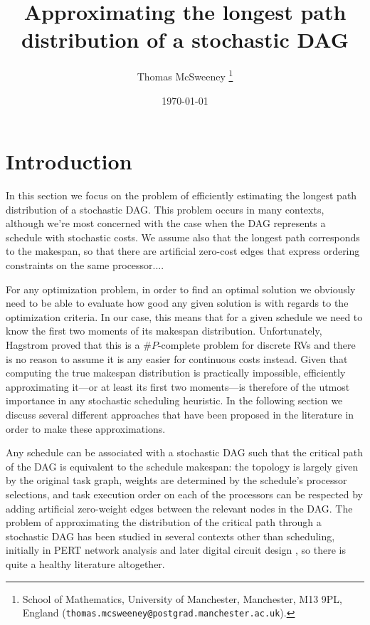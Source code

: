 \documentclass[12pt]{article}
\title{Approximating the longest path distribution of a stochastic DAG} %
\author{Thomas McSweeney%
	\thanks{%
		School of Mathematics,
		University of Manchester,
		Manchester, M13 9PL, England
		(\texttt{thomas.mcsweeney@postgrad.manchester.ac.uk}).
	}
}
\date{\today}
\begin{document}
	\maketitle 	


\section{Introduction}
\label{sect.intro}

In this section we focus on the problem of efficiently estimating the longest path distribution of a stochastic DAG. This problem occurs in many contexts, although we're most concerned with the case when the DAG represents a schedule with stochastic costs. We assume also that the longest path corresponds to the makespan, so that there are artificial zero-cost edges that express ordering constraints on the same processor....

For any optimization problem, in order to find an optimal solution we obviously need to be able to evaluate how good any given solution is with regards to the optimization criteria. In our case, this means that for a given schedule we need to know the first two moments of its makespan distribution. Unfortunately, Hagstrom \cite{hag88} proved that this is a $\#P$-complete problem for discrete RVs and there is no reason to assume it is any easier for continuous costs instead. Given that computing the true makespan distribution is practically impossible, efficiently approximating it---or at least its first two moments---is therefore of the utmost importance in any stochastic scheduling heuristic. In the following section we discuss several different approaches that have been proposed in the literature in order to make these approximations.

Any schedule can be associated with a stochastic DAG such that the critical path of the DAG is equivalent to the schedule makespan: the topology is largely given by the original task graph, weights are determined by the schedule's processor selections, and task execution order on each of the processors can be respected by adding artificial zero-weight edges between the relevant nodes in the DAG. The problem of approximating the distribution of the critical path through a stochastic DAG has been studied in several contexts other than scheduling, initially in PERT network analysis \cite{mal59} and later digital circuit design \cite{bla08}, so there is quite a healthy literature altogether. 
\end{document}
